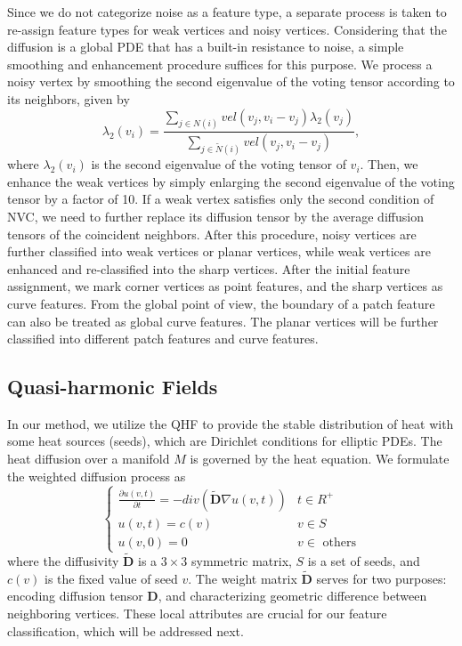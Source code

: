 \documentclass[10pt,journal,cspaper,compsoc]{IEEEtran}
\begin{document}
Since we do not categorize noise as a feature type, a separate process
is taken to re-assign feature types for weak vertices and noisy
vertices. Considering that the diffusion is a global PDE that has a
built-in resistance to noise, a simple smoothing and enhancement
procedure suffices for this purpose. We process a noisy vertex by
smoothing the second eigenvalue of the voting tensor according to its
neighbors, given by
\begin{equation}\label{eq:enhancement_1}
\lambda_2(v_i) = \frac{\sum_{j\in N(i)} vel(v_j,v_i-v_j)\lambda_2(v_j)}{\sum_{j\in \widetilde{N}(i)} vel(v_j,v_i-v_j)},
\end{equation}
where $\lambda_2(v_i)$ is the second eigenvalue of the voting tensor
of $v_i$. Then, we enhance the weak vertices by simply enlarging
the second eigenvalue of the voting tensor by a factor of 10.  If a
weak vertex satisfies only the second condition of NVC, we need
to further replace its diffusion tensor by the average diffusion
tensors of the coincident neighbors.  After this procedure, noisy
vertices are further classified into weak vertices or planar
vertices, while weak vertices are enhanced and re-classified into
the sharp vertices. After the initial feature assignment, we
mark corner vertices as point features, and the sharp vertices
as curve features. From the global point of view, the boundary of a
patch feature can also be treated as global curve features. The planar
vertices will be further classified into different patch features and
curve features.

\subsection{Quasi-harmonic Fields}
\label{sec:WHF}

In our method, we utilize the QHF to provide the stable distribution
of heat with some heat sources (seeds), which are Dirichlet conditions
for elliptic PDEs. The heat diffusion over a manifold $M$ is
governed by the heat equation. We formulate the weighted diffusion
process as
\begin{equation}\label{eq:diffusion}
\begin{cases}
\frac{\partial u(v,t)}{\partial t}=-div(\widetilde{\textbf{D}} \nabla u(v,t)) & t \in R^{+}\\
u(v,t)=c(v) & v \in S\\ u(v,0)=0 & \mbox{$v \in$ others}
\end{cases}
\end{equation}
where the diffusivity $\widetilde{\textbf{D}}$ is a $3\times3$
symmetric matrix, $S$ is a set of seeds, and $c(v)$ is the fixed value
of seed $v$. The weight matrix $\widetilde{\textbf{D}}$ serves for two
purposes: encoding diffusion tensor $\textbf{D}$, and characterizing
geometric difference between neighboring vertices. These local
attributes are crucial for our feature classification, which will be
addressed next.
\end{document}

